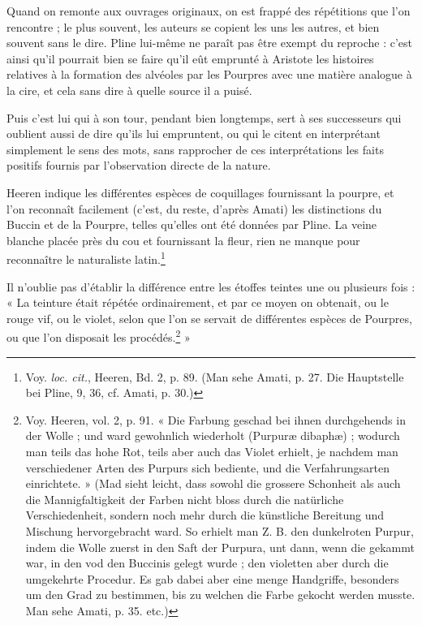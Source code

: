 \documentclass[a4paper, 11pt, oneside, polutonikogreek, french]{article}
\begin{document}
Quand on remonte aux ouvrages originaux, on est frappé des répétitions que l'on rencontre ; le plus souvent, les auteurs se copient les uns les autres, et bien souvent sans le dire. Pline lui-même ne paraît pas être exempt du reproche : c'est ainsi qu'il pourrait bien se faire qu'il eût emprunté à Aristote les histoires relatives à la formation des alvéoles par les Pourpres avec une matière analogue à la cire, et cela sans dire à quelle source il a puisé.

Puis c'est lui qui à son tour, pendant bien longtemps, sert à ses successeurs qui oublient aussi de dire qu'ils lui empruntent, ou qui le citent en interprétant simplement le sens des mots, sans rapprocher de ces interprétations les faits positifs fournis par l'observation directe de la nature.

Heeren indique les différentes espèces de coquillages fournissant la pourpre, et l'on reconnaît facilement (c'est, du reste, d'après Amati) les distinctions du Buccin et de la Pourpre, telles qu'elles ont été données par Pline. La veine blanche placée près du cou et fournissant la fleur, rien ne manque pour reconnaître le naturaliste latin.\footnote{Voy. \emph{loc. cit.}, Heeren, Bd. 2, p. 89. (Man sehe Amati, p. 27. Die Hauptstelle bei Pline, 9, 36, cf. Amati, p. 30.)}

Il n'oublie pas d'établir la différence entre les étoffes teintes une ou plusieurs fois : « La teinture était répétée ordinairement, et par ce moyen on obtenait, ou le rouge vif, ou le violet, selon que l'on se servait de différentes espèces de Pourpres, ou que l'on disposait les procédés.\footnote{Voy. Heeren, vol. 2, p. 91. « Die Farbung geschad bei ihnen durchgehends in der Wolle ; und ward gewohnlich wiederholt (Purpuræ dibaphæ) ; wodurch man teils das hohe Rot, teils aber auch das Violet erhielt, je nachdem man verschiedener Arten des Purpurs sich bediente, und die Verfahrungsarten einrichtete. » (Mad sieht leicht, dass sowohl die grossere Schonheit als auch die Mannigfaltigkeit der Farben nicht bloss durch die natürliche Verschiedenheit, sondern noch mehr durch die künstliche Bereitung und Mischung hervorgebracht ward. So erhielt man Z. B. den dunkelroten Purpur, indem die Wolle zuerst in den Saft der Purpura, unt dann, wenn die gekammt war, in den vod den Buccinis gelegt wurde ; den violetten aber durch die umgekehrte Procedur. Es gab dabei aber eine menge Handgriffe, besonders um den Grad zu bestimmen, bis zu welchen die Farbe gekocht werden musste. Man sehe Amati, p. 35. etc.)} »
\end{document}
